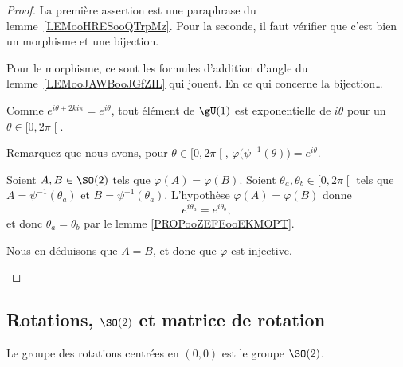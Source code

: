 \begin{proof}
	La première assertion est une paraphrase du lemme~\ref{LEMooHRESooQTrpMz}. Pour la seconde, il faut vérifier que c'est bien un morphisme et une bijection.

	Pour le morphisme, ce sont les formules d'addition d'angle du lemme~\ref{LEMooJAWBooJGfZIL} qui jouent. En ce qui concerne la bijection\ldots

	\begin{subproof}
		\item[Surjection]
		Comme \( e^{i\theta+2ki\pi}= e^{i\theta}\), tout élément de \( \gU(1)\) est exponentielle de \( i\theta\) pour un \( \theta\in\mathopen[ 0 , 2\pi \mathclose[\).
		\item[Injection]
            Remarquez que nous avons, pour \( \theta\in\mathopen[ 0 , 2\pi \mathclose[\), \( \varphi\big( \psi^{-1}(\theta) \big)= e^{i\theta}\).

                Soient \( A,B\in \SO(2)\) tels que \( \varphi(A)=\varphi(B)\). Soient \( \theta_a,\theta_b\in\mathopen[ 0 , 2\pi \mathclose[\) tels que \( A=\psi^{-1}(\theta_a)\) et \( B=\psi^{-1}(\theta_a)\). L'hypothèse \( \varphi(A)=\varphi(B)\) donne
                    \begin{equation}
                        e^{i\theta_a}= e^{i\theta_b},
                    \end{equation}
                    et donc \( \theta_a=\theta_b\) par le lemme \ref{PROPooZEFEooEKMOPT}.
                    
                    Nous en déduisons que \( A=B\), et donc que \( \varphi\) est injective.
	\end{subproof}
\end{proof}

\subsection{Rotations, \( \SO(2)\) et matrice de rotation}

\begin{corollary} \label{CORooVYUJooDbkIFY}
	Le groupe des rotations centrées en \( (0,0)\) est le groupe \( \SO(2)\).
\end{corollary}

